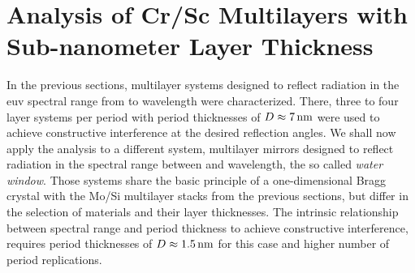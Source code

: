 \section{Analysis of Cr/Sc Multilayers with Sub-nanometer Layer Thickness} \label{ch_spec:sec_CrSc}
In the previous sections, multilayer systems designed to reflect radiation in the \gls{euv} spectral range from  to  wavelength were characterized. There, three to four layer systems per period with period thicknesses of $D\approx\nm{7}$ were used to achieve constructive interference at the desired reflection angles. We shall now apply the analysis to a different system, multilayer mirrors designed to reflect radiation in the spectral range between  and  wavelength, the so called \emph{water window}. Those systems share the basic principle of a one-dimensional Bragg crystal with the Mo/Si multilayer stacks from the previous sections, but differ in the selection of materials and their layer thicknesses. The intrinsic relationship between spectral range and period thickness to achieve constructive interference, requires period thicknesses of $D\approx \nm{1.5}$ for this case and higher number of period replications.


